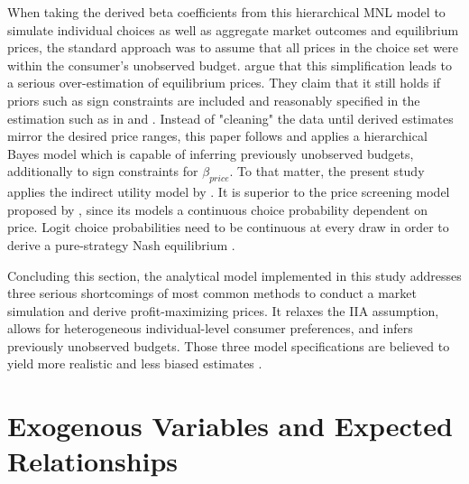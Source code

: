 \documentclass[12pt,a4paper]{article}
\begin{document}
When taking the derived beta coefficients from this hierarchical MNL model to simulate individual choices as well as aggregate market outcomes and equilibrium prices,
the standard approach was to assume that all prices in the choice set were within the consumer's unobserved budget.
\cite{pachaliPerilsIgnoringBudget2017} argue that this simplification leads to a serious over-estimation of equilibrium prices.
They claim that it still holds if priors such as sign constraints are included and reasonably specified in the estimation such as in \cite{sonnierHeterogeneityDistributionsWillingnesstopay2007} and \cite{allenbyEconomicValuationProduct2014}.
Instead of "cleaning" the data until derived estimates mirror the desired price ranges, this paper follows \cite{pachaliPerilsIgnoringBudget2017}
and applies a hierarchical Bayes model which is capable of inferring previously unobserved budgets, additionally to sign constraints for $\beta_{price}$.
To that matter, the present study applies the indirect utility model by \cite{berryAutomobilePricesMarket1995}.
It is superior to the price screening model proposed by \cite{gilbrideChoiceModelConjunctive2004},
since its models a continuous choice probability dependent on price.
Logit choice probabilities need to be continuous at every draw in order to derive a pure-strategy Nash equilibrium \citep{morrowFixedPointApproachesComputing2011a, pachaliPerilsIgnoringBudget2017}.

Concluding this section, the analytical model implemented in this study addresses three serious shortcomings of most common methods to conduct a market simulation and derive profit-maximizing prices.
It relaxes the IIA assumption, allows for heterogeneous individual-level consumer preferences, and infers previously unobserved budgets.
Those three model specifications are believed to yield more realistic and less biased estimates \citep{chandukalaChoiceModelsMarketing2008, pachaliPerilsIgnoringBudget2017}.


\section{Exogenous Variables and Expected Relationships} \label{sec_vars_relat}
\end{document}
